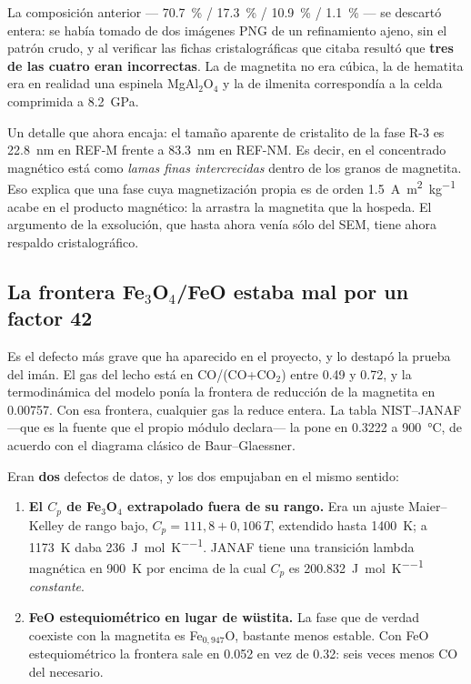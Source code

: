 \documentclass[11pt,a4paper]{article}
\begin{document}
La composición anterior --- \qty{70.7}{\percent} / \qty{17.3}{\percent} /
\qty{10.9}{\percent} / \qty{1.1}{\percent} --- se descartó entera: se había
tomado de dos imágenes PNG de un refinamiento ajeno, sin el patrón crudo, y al
verificar las fichas cristalográficas que citaba resultó que \textbf{tres de las
cuatro eran incorrectas}. La de magnetita no era cúbica, la de hematita era en
realidad una espinela MgAl$_2$O$_4$ y la de ilmenita correspondía a la celda
comprimida a \SI{8.2}{\giga\pascal}.

Un detalle que ahora encaja: el tamaño aparente de cristalito de la fase R-3 es
\SI{22.8}{\nano\meter} en REF-M frente a \SI{83.3}{\nano\meter} en REF-NM. Es
decir, en el concentrado magnético está como \emph{lamas finas intercrecidas}
dentro de los granos de magnetita. Eso explica que una fase cuya magnetización
propia es de orden \qty{1.5}{\ampere\meter\squared\per\kilo\gram} acabe en el
producto magnético: la arrastra la magnetita que la hospeda. El argumento de la
exsolución, que hasta ahora venía sólo del SEM, tiene ahora respaldo
cristalográfico.

\subsection{La frontera Fe$_3$O$_4$/FeO estaba mal por un factor 42}
\label{sec:frontera}

Es el defecto más grave que ha aparecido en el proyecto, y lo destapó la prueba
del imán. El gas del lecho está en CO/(CO+CO$_2$) entre \num{0.49} y \num{0.72},
y la termodinámica del modelo ponía la frontera de reducción de la magnetita en
\num{0.00757}. Con esa frontera, cualquier gas la reduce entera. La tabla
NIST--JANAF ---que es la fuente que el propio módulo declara--- la pone en
\num{0.3222} a \SI{900}{\celsius}, de acuerdo con el diagrama clásico de
Baur--Glaessner.

Eran \textbf{dos} defectos de datos, y los dos empujaban en el mismo sentido:

\begin{enumerate}
\item \textbf{El $C_p$ de Fe$_3$O$_4$ extrapolado fuera de su rango.} Era un
  ajuste Maier--Kelley de rango bajo, $C_p = 111{,}8 + 0{,}106\,T$, extendido
  hasta \SI{1400}{\kelvin}; a \SI{1173}{\kelvin} daba
  \qty{236}{\joule\per\mole\per\kelvin}. JANAF tiene una transición lambda
  magnética en \SI{900}{\kelvin} por encima de la cual $C_p$ es
  \qty{200.832}{\joule\per\mole\per\kelvin} \emph{constante}.
\item \textbf{FeO estequiométrico en lugar de wüstita.} La fase que de verdad
  coexiste con la magnetita es Fe$_{0{,}947}$O, bastante menos estable. Con FeO
  estequiométrico la frontera sale en \num{0.052} en vez de \num{0.32}: seis
  veces menos CO del necesario.
\end{enumerate}
\end{document}
